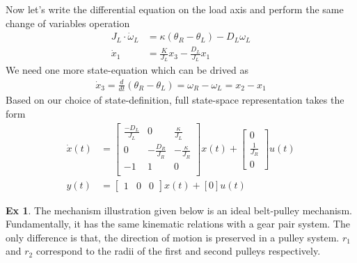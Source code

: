 \documentclass[twoside]{article}
\theoremstyle{definition}
\newtheorem{exmp}[theorem]{Ex}
\begin{document}
Now let's write the differential equation on the load axis and perform
the same change of variables operation 
%
\begin{align*}
J_L \cdot \dot{\omega}_L &= \kappa ( \theta_R - \theta_L) - D_L \omega_L
\\
\dot{x}_1 &= \frac{K}{J_L} x_3 - \frac{D_L}{J_L} x_1
\end{align*}    
%
We need one more state-equation which can be drived as
%
\begin{align*}
   \dot{x}_3 = \frac{d}{dt} \left( \theta_R - \theta_L \right) =
  \omega_R - \omega_L = x_2 - x_1
\end{align*}
%
Based on our choice of state-definition, full state-space
representation takes the form
%
\begin{align*}
\dot{x}(t) &= \left[ \begin{array}{ccc} \frac{-D_L}{J_L} & 0 & \frac{\kappa}{J_L}  \\
0 & -\frac{D_R}{J_R} & -\frac{\kappa}{J_R} 
\\
-1 & 1 & 0 \\
\end{array} \right] x(t) +
                   \left[ \begin{array}{c} 0 \\ \frac{1}{J_R} \\
                            0 \end{array} \right] u(t)
\\
y(t) &= \left[ \begin{array}{ccc} 1 & 0 & 0 \end{array} \right] x(t) +
                                          [0] u(t)
\end{align*}    


\begin{exmp}
The mechanism illustration given below is an ideal belt-pulley
mechanism. Fundamentally, it has the same
kinematic relations with a gear pair system. The only difference is that, the direction of motion is preserved
in a pulley system. $r_1$ and $r_2$ correspond to the radii of the
first and second pulleys respectively. 
\end{exmp}
  
\vspace{12pt}
  
\end{document}
